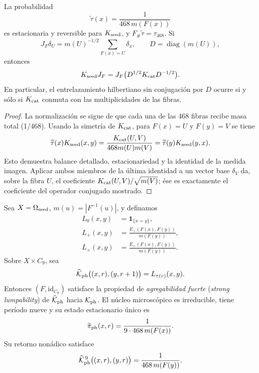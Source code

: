 \begin{theorem}
\label{thm:elevacion-reversible-cociente}
La probabilidad
\[
 \widetilde\tau(x)
 =\frac1{468\,m(F(x))}
\]
es estacionaria y reversible para \(K_{\rm seed}\), y
\(F_\#\widetilde\tau=\tau_{468}\). Si
\[
 J_F\delta_U
 =m(U)^{-1/2}\sum_{F(x)=U}\delta_x,
 \qquad
 D=\operatorname{diag}(m(U)),
\]
entonces
\[
 K_{\rm seed}J_F
 =J_F\bigl(D^{1/2}K_{\rm cat}D^{-1/2}\bigr).
\]
En particular, el entrelazamiento hilbertiano sin conjugación por \(D\)
ocurre si y sólo si \(K_{\rm cat}\) conmuta con las multiplicidades de las
fibras.
\end{theorem}

\begin{proof}
La normalización se sigue de que cada una de las 468 fibras recibe masa
total (1/468). Usando la simetría de \(K_{\rm cat}\), para
\(F(x)=U\) y \(F(y)=V\) se tiene
\[
 \widetilde\tau(x)K_{\rm seed}(x,y)
 =\frac{K_{\rm cat}(U,V)}{468m(U)m(V)}
 =\widetilde\tau(y)K_{\rm seed}(y,x).
\]
Esto demuestra balance detallado, estacionariedad y la identidad de la
medida imagen.
Aplicar ambos miembros de la última identidad a un vector base
\(\delta_V\) da, sobre la fibra \(U\), el coeficiente
\(K_{\rm cat}(U,V)/\sqrt{m(V)}\); ése es exactamente el coeficiente del
operador conjugado mostrado.
\end{proof}

\begin{theorem}
\label{thm:elevacion-fase-semillas}
Sea \(X=\Omega_{\rm seed}\), \(m(u)=|F^{-1}(u)|\), y definamos
\[
\begin{aligned}
 L_0(x,y)&=\mathbf1_{\{x=y\}},\\
 L_+(x,y)&=\frac{E_+(F(x),F(y))}{m(F(y))},\\
 L_\times(x,y)&=\frac{E_\times(F(x),F(y))}{m(F(y))}.
\end{aligned}
\]
Sobre \(X\times C_9\), sea
\[
 \widehat{\mathcal K}_{\rm ph}\bigl((x,r),(y,r+1)\bigr)
 =L_{\tau(r)}(x,y).
\]
Entonces \((F,\mathrm{id}_{C_9})\) satisface la propiedad de
\emph{agregabilidad fuerte} (\emph{strong lumpability}) de
\(\widehat{\mathcal K}_{\rm ph}\) hacia \(\mathcal K_{\rm ph}\). El núcleo
microscópico es irreducible, tiene período nueve y su estado estacionario
único es
\[
 \widetilde\pi_{\rm ph}(x,r)
 =\frac1{9\cdot468\,m(F(x))}.
\]
Su retorno nonádico satisface
\[
 \widehat{\mathcal K}_{\rm ph}^{\,9}
 \bigl((x,r),(y,r)\bigr)
 =\frac1{468\,m(F(y))}.
\]
\end{theorem}


